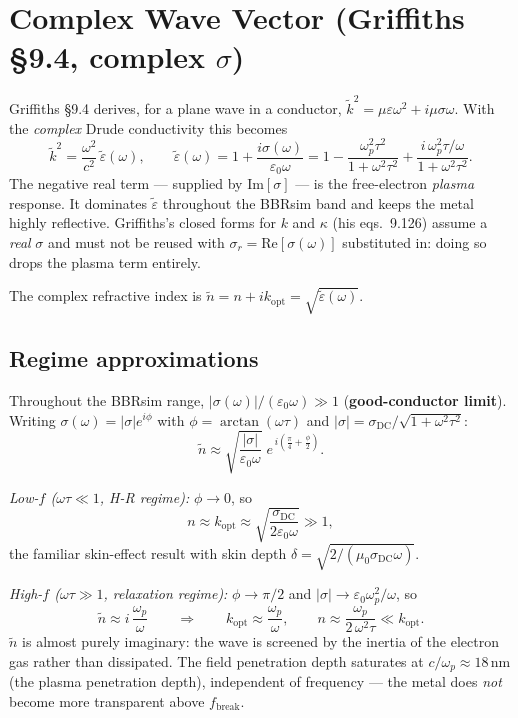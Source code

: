 \documentclass[11pt]{article}
\begin{document}
\section{Complex Wave Vector (Griffiths \S9.4, complex $\sigma$)}

Griffiths \S9.4 derives, for a plane wave in a conductor,
$\tilde{k}^2 = \mu\varepsilon\omega^2 + i\mu\sigma\omega$.  With the
\emph{complex} Drude conductivity this becomes
\[
  \tilde{k}^2 = \frac{\omega^2}{c^2}\,\tilde{\varepsilon}(\omega),
  \qquad
  \tilde{\varepsilon}(\omega) = 1 + \frac{i\sigma(\omega)}{\varepsilon_0\omega}
  = 1 - \frac{\omega_p^2\tau^2}{1+\omega^2\tau^2}
      + \frac{i\,\omega_p^2\tau/\omega}{1+\omega^2\tau^2}.
\]
The negative real term — supplied by $\mathrm{Im}[\sigma]$ — is the
free-electron \emph{plasma} response.  It dominates
$\tilde{\varepsilon}$ throughout the BBRsim band and keeps the metal
highly reflective.  Griffiths's closed forms for $k$ and $\kappa$
(his eqs.\ 9.126) assume a \emph{real} $\sigma$ and must not be reused
with $\sigma_r = \mathrm{Re}[\sigma(\omega)]$ substituted in: doing so
drops the plasma term entirely.

The complex refractive index is $\tilde{n} = n + ik_\mathrm{opt} =
\sqrt{\tilde{\varepsilon}(\omega)}$.

\subsection*{Regime approximations}

Throughout the BBRsim range, $|\sigma(\omega)|/(\varepsilon_0\omega) \gg 1$
(\textbf{good-conductor limit}).  Writing
$\sigma(\omega) = |\sigma|e^{i\phi}$ with $\phi = \arctan(\omega\tau)$ and
$|\sigma| = \sigma_\mathrm{DC}/\sqrt{1+\omega^2\tau^2}$:
\[
  \tilde{n} \approx \sqrt{\frac{|\sigma|}{\varepsilon_0\omega}}\;
  e^{\,i\left(\frac{\pi}{4} + \frac{\phi}{2}\right)} .
\]

\smallskip
\noindent\textit{Low-$f$ ($\omega\tau\ll 1$, H-R regime):} $\phi\to 0$, so
\[
  n \approx k_\mathrm{opt} \approx
  \sqrt{\frac{\sigma_\mathrm{DC}}{2\varepsilon_0\omega}} \gg 1,
\]
the familiar skin-effect result with skin depth
$\delta = \sqrt{2/(\mu_0\sigma_\mathrm{DC}\omega)}$.

\smallskip
\noindent\textit{High-$f$ ($\omega\tau\gg 1$, relaxation regime):}
$\phi\to\pi/2$ and $|\sigma| \to \varepsilon_0\omega_p^2/\omega$, so
\[
  \tilde{n} \approx i\,\frac{\omega_p}{\omega}
  \qquad\Longrightarrow\qquad
  k_\mathrm{opt} \approx \frac{\omega_p}{\omega},
  \qquad
  n \approx \frac{\omega_p}{2\,\omega^2\tau} \ll k_\mathrm{opt}.
\]
$\tilde{n}$ is almost purely imaginary: the wave is screened by the inertia
of the electron gas rather than dissipated.  The field penetration depth
saturates at $c/\omega_p \approx 18$\,nm (the plasma penetration depth),
independent of frequency — the metal does \emph{not} become more
transparent above $f_\mathrm{break}$.
\end{document}
